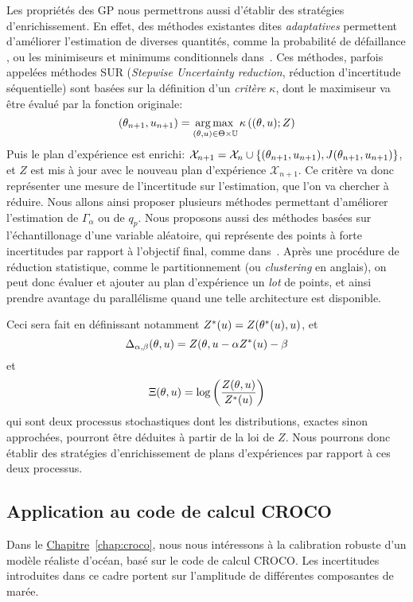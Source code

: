 \documentclass[../../Main_ManuscritThese.tex]{subfiles}
\newcommand{\frchap}[1]{\hyperref[#1]{Chapitre}~\ref{#1}}
\begin{document}
Les propriétés des GP nous permettrons aussi d'établir des stratégies
d'enrichissement. En effet, des méthodes existantes dites
\emph{adaptatives} permettent d'améliorer l'estimation de diverses
quantités, comme la probabilité de défaillance
\cite{razaaly_rare_2019,moustapha_quantile-based_2016,bect_sequential_2012},
ou les minimiseurs et minimums conditionnels
dans~\cite{ginsbourger_bayesian_2014}. Ces méthodes, parfois appelées
méthodes SUR (\emph{Stepwise Uncertainty reduction}, réduction
d'incertitude séquentielle) sont basées sur la définition d'un
\emph{critère} $\kappa$, dont le maximiseur va être évalué par la fonction
originale:
\begin{equation*}
  (\theta_{n+1}, u_{n+1}) = \operatorname*{arg\,max \,}_{(\theta,u) \in \Theta\times\mathbb{U}} \kappa\left((\theta, u); Z\right)
\end{equation*}
Puis le plan d'expérience est enrichi:
$\mathcal{X}_{n+1} = \mathcal{X}_n \cup \{(\theta_{n+1}, u_{n+1}),
J(\theta_{n+1}, u_{n+1})\}$, et $Z$ est mis à jour avec le nouveau plan
d'expérience $\mathcal{X}_{n+1}$.  Ce critère va donc représenter une
mesure de l'incertitude sur l'estimation, que l'on va chercher à
réduire. Nous allons ainsi proposer plusieurs méthodes permettant
d'améliorer l'estimation de $\Gamma_{\alpha}$ ou de $q_p$.  Nous
proposons aussi des méthodes basées sur l'échantillonage d'une
variable aléatoire, qui représente des points à forte incertitudes par
rapport à l'objectif final, comme
dans~\cite{echard_ak-mcs_2011,razaaly_rare_2019}. Après une procédure
de réduction statistique, comme le partitionnement (ou
\emph{clustering} en anglais), on peut donc évaluer et ajouter au plan
d'expérience un \emph{lot} de points, et ainsi prendre avantage du
parallélisme quand une telle architecture est disponible.

Ceci sera fait en définissant notamment
$Z^*(u) = Z(\theta^*(u),u)$, et
\begin{equation*}
  \Delta_{\alpha,\beta}(\theta, u) = Z(\theta, u - \alpha Z^*(u) - \beta
\end{equation*}
et
\begin{equation*}
  \Xi(\theta, u) = \log\left(\frac{Z(\theta, u)}{Z^*(u)}\right)
\end{equation*}
qui sont deux processus stochastiques dont les distributions, exactes
sinon approchées, pourront être déduites à partir de la loi de $Z$.
Nous pourrons donc établir des stratégies d'enrichissement de plans
d'expériences par rapport à ces deux processus.


\subsection*{Application au code de calcul CROCO}
Dans le \frchap{chap:croco}, nous nous intéressons à la calibration
robuste d'un modèle réaliste d'océan, basé sur le code de calcul
CROCO. Les incertitudes introduites dans ce cadre portent sur
l'amplitude de différentes composantes de marée.
\end{document}
